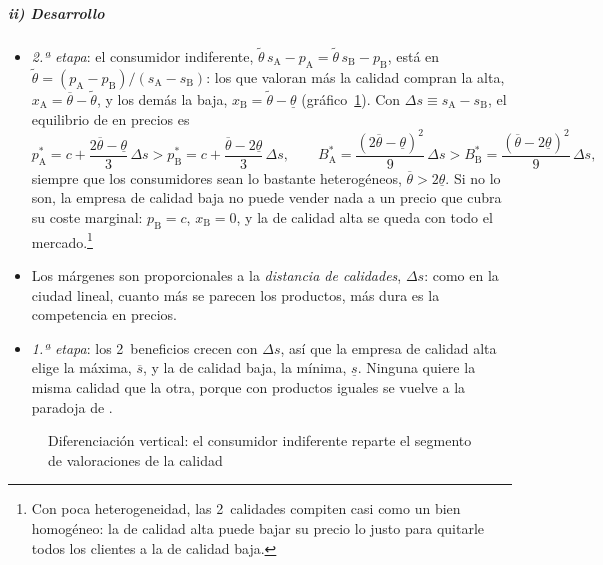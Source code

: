 \documentclass[11pt]{article}
\begin{document}
\subparagraph{ii) Desarrollo}

\begin{itemize}
\item \emph{2.ª etapa}: el consumidor indiferente, $\tilde{\theta}\,s_{\mathrm{A}}-p_{\mathrm{A}}=\tilde{\theta}\,s_{\mathrm{B}}-p_{\mathrm{B}}$, está en $\tilde{\theta}=(p_{\mathrm{A}}-p_{\mathrm{B}})/(s_{\mathrm{A}}-s_{\mathrm{B}})$: los que valoran más la calidad compran la alta, $x_{\mathrm{A}}=\overline{\theta}-\tilde{\theta}$, y los demás la baja, $x_{\mathrm{B}}=\tilde{\theta}-\underline{\theta}$ (gráfico~\ref{fig:shaked-sutton}). Con $\Delta s\equiv s_{\mathrm{A}}-s_{\mathrm{B}}$, el equilibrio de  en precios es
  \begin{equation}\label{eq:shaked-sutton}
  p_{\mathrm{A}}^*=c+\frac{2\overline{\theta}-\underline{\theta}}{3}\,\Delta s>p_{\mathrm{B}}^*=c+\frac{\overline{\theta}-2\underline{\theta}}{3}\,\Delta s,\qquad B_{\mathrm{A}}^*=\frac{(2\overline{\theta}-\underline{\theta})^2}{9}\,\Delta s>B_{\mathrm{B}}^*=\frac{(\overline{\theta}-2\underline{\theta})^2}{9}\,\Delta s,
  \end{equation}
  siempre que los consumidores sean lo bastante heterogéneos, $\overline{\theta}>2\underline{\theta}$. Si no lo son, la empresa de calidad baja no puede vender nada a un precio que cubra su coste marginal: $p_{\mathrm{B}}=c$, $x_{\mathrm{B}}=0$, y la de calidad alta se queda con todo el mercado.\footnote{Con poca heterogeneidad, las 2~calidades compiten casi como un bien homogéneo: la de calidad alta puede bajar su precio lo justo para quitarle todos los clientes a la de calidad baja.}
\item Los márgenes son proporcionales a la \emph{distancia de calidades}, $\Delta s$: como en la ciudad lineal, cuanto más se parecen los productos, más dura es la competencia en precios.
\item \emph{1.ª etapa}: los 2~beneficios crecen con $\Delta s$, así que la empresa de calidad alta elige la máxima, $\overline{s}$, y la de calidad baja, la mínima, $\underline{s}$. Ninguna quiere la misma calidad que la otra, porque con productos iguales se vuelve a la paradoja de .
\end{itemize}

\begin{figure}[H]
\centering
\caption{Diferenciación vertical: el consumidor indiferente reparte el segmento de valoraciones de la calidad}\label{fig:shaked-sutton}
\end{figure}
\end{document}
